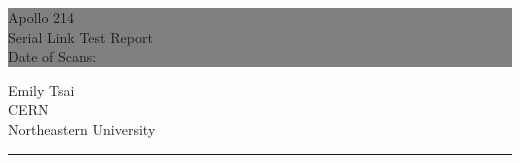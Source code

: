 \documentclass{report}
\begin{document}

\begin{titlepage} %


  \colorbox{grey}{
    \parbox[t]{0.93\textwidth}{ %
      \parbox[t]{0.91\textwidth}{ %
        \raggedleft %
        \fontsize{80pt}{40pt}\selectfont %
        \vspace{0.7cm} %

        Apollo 214 \\
        Serial Link Test Report \\
        Date of Scans: \dateofscans \\

        \vspace{0.7cm} %
      }
    }
  }

  \vfill %


  \parbox[t]{0.93\textwidth}{ %
    \raggedleft %
    \large %
    {\Large Emily Tsai} \\[4pt] %
    CERN \\
    Northeastern University \\[4pt] %
    \hfill\rule{0.2\linewidth}{1pt} %
  }

\end{titlepage}

\hypertarget{MyToc}{} %
\tableofcontents
\newpage
\end{document}
